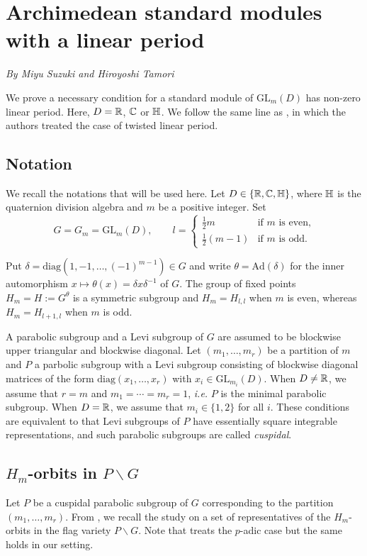 \documentclass[11pt,letterpaper]{amsart}
\newcommand{\GL}{{\mathrm {GL}}} \newcommand{\PGL}{{\mathrm {PGL}}}
\newcommand{\Ad}{\mathrm{Ad}}
\def\diag{\mathrm{diag}}
\theoremstyle{plain}
\numberwithin{equation}{section}
\begin{document}
\section{Archimedean standard modules with a linear period}\label{app ST}

\begin{center}\textit{By Miyu Suzuki and Hiroyoshi Tamori}\end{center}

We prove a necessary condition for a standard module of $\GL_m(D)$ has non-zero linear period.
Here,  $D={\mathbb {R}}$,  ${\mathbb {C}}$ or ${\mathbb {H}}$.
We follow the same line as \cite{ST},  in which the authors treated the case of twisted linear period.

\subsection{Notation}\label{sec not ST}
\label{sec:notation}
We recall the notations that will be used here. Let $D\in\{{\mathbb {R}},  {\mathbb {C}},  {\mathbb {H}}\}$,  where ${\mathbb {H}}$ is the quaternion division algebra and $m$ be a positive integer.
Set
    \[
    G=G_m=\GL_m(D),  \qquad l=
        \begin{cases}
        \frac12 m & \text{if $m$ is even,} \\
        \frac12(m-1) & \text{if $m$ is odd.}
        \end{cases}
    \]

Put $\delta=\diag(1,  -1,  \ldots,  (-1)^{m-1})\in G$ and write $\theta=\Ad(\delta)$ for the inner automorphism $x\mapsto \theta(x)=\delta x\delta^{-1}$ of $G$.    
The group of fixed points $H_m=H:=G^\theta$ is a symmetric subgroup and $H_m=H_{l,l}$ when $m$ is even, whereas $H_m=H_{l+1,l}$ when $m$ is odd. 

A parabolic subgroup and a Levi subgroup of $G$ are assumed to be blockwise upper triangular and blockwise diagonal.  
Let $(m_1,  \ldots,  m_r)$ be a partition of $m$ and $P$ a parbolic subgroup with a Levi subgroup %
consisting of blockwise diagonal matrices of the form $\diag(x_1,\ldots,x_r)$ with $x_i\in \GL_{m_i}(D)$.
When $D\neq {\mathbb {R}}$,  we assume that $r=m$ and $m_1=\cdots=m_r=1$,  \emph{i.e.} $P$ is the minimal parabolic subgroup.
When $D={\mathbb {R}}$,  we assume that $m_i\in\{1,  2\}$ for all $i$.
These conditions are equivalent to that Levi subgroups of $P$ have essentially square integrable representations,  and such parabolic subgroups are called \emph{cuspidal}.


\subsection{$H_m$-orbits in $P\backslash G$}\label{sec orb ST}
Let $P$ be a cuspidal parabolic subgroup of $G$ corresponding to the partition $(m_1,  \ldots,  m_r)$.
From \cite[Section 3.1]{MatCRELLE},  we recall the study on a set of representatives of the $H_m$-orbits in the flag variety $P\backslash G$.
Note that \cite{MatCRELLE} treats the $p$-adic case but the same holds in our setting.
\end{document}
